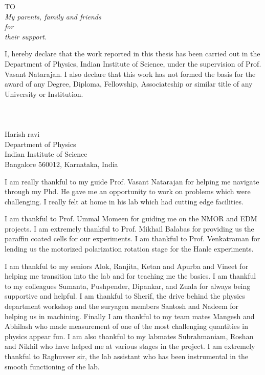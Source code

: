 
\begin{dedication}
\begin{center}
TO \\[2em]
\large\it My parents, family and friends\\
for\\
\large\it their support.
\end{center}
\end{dedication}
I, hereby declare that the work reported in this thesis has been carried out in the Department of Physics, Indian Institute of Science, under the supervision of Prof. Vasant Natarajan. I also declare that this work has not formed the basis for the award of any Degree, Diploma, Fellowship, Associateship or similar title of any University or Institution.
 \\
 \\
 \\
 \\
Harish ravi\\
Department of Physics\\
Indian Institute of Science\\
Bangalore 560012, Karnataka, India


\acknowledgements

I am really thankful to my guide Prof. Vasant Natarajan for helping me navigate through my Phd. He gave me an opportunity to work on problems which were challenging. I really felt at home in his lab which had cutting edge facilities. 

I am thankful to Prof. Ummal Momeen for guiding me on the NMOR and EDM projects. I am extremely thankful to Prof. Mikhail Balabas for providing us the paraffin coated cells for our experiments. I am thankful to Prof. Venkatraman for lending us the motorized polarization rotation stage for the Hanle experiments.

I am thankful to my seniors Alok, Ranjita, Ketan and Apurba and Vineet for helping me transition into the lab and for teaching me the basics. I am thankful to my colleagues Sumanta, Pushpender, Dipankar, and Zuala for always being supportive and helpful. I am thankful to Sherif, the drive behind the physics department workshop and the suryagen members Santosh and Nadeem for helping us in machining. Finally I am thankful to my team mates Mangesh and Abhilash who made measurement of one of the most challenging quantities in physics appear fun. I am also thankful to my labmates Subrahmaniam, Roshan and Nikhil who have helped me at various stages in the project. I am extremely thankful to Raghuveer sir, the lab assistant who has been instrumental in the smooth functioning of the lab.

